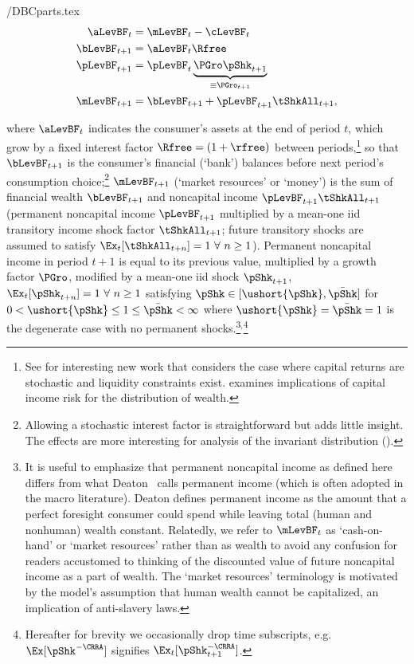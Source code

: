 \documentclass[./BufferStockTheory.tex]{subfiles}
\begin{document}
\begin{verbatimwrite}{\EqDir/DBCparts.tex}
\begin{align}
\aLevBF_{t}    & = \mLevBF_{t}-\cLevBF_{t}  \label{eq:DBCparts} \\
\bLevBF_{t+1}    & = \aLevBF_{t} \Rfree \notag \\
\pLevBF_{t+1}  & = \pLevBF_{t} \underbrace{\PGro\pShk_{t+1}}_{\equiv \PGro_{t+1}}  \notag \\
\mLevBF_{t+1}  & =  \bLevBF_{t+1} +\pLevBF_{t+1}\tShkAll_{t+1},  \notag
\end{align}
\end{verbatimwrite}
 where $\aLevBF_{t}$ indicates the consumer's assets at the end of period $t$, which grow by a fixed interest factor $\Rfree =(1+\rfree)$ between periods,\footnote{See \cite{mstCapIncFluct} for interesting new work that considers the case where capital returns are stochastic and liquidity constraints exist.  \cite{benhabibWealth} examines implications of capital income risk for the distribution of wealth.}  so that $\bLevBF_{t+1}$ is the consumer's financial (`bank') balances before next period's consumption choice;\footnote{Allowing a stochastic interest factor is straightforward but adds little insight.  The effects are more interesting for analysis of the invariant distribution (\cite{szeidlInvariant}).} $\mLevBF_{t+1}$ (`market resources' or `money') is the sum of financial wealth $\bLevBF_{t+1}$ and noncapital income $\pLevBF_{t+1}\tShkAll_{t+1}$ (permanent noncapital income $\pLevBF_{t+1}$ multiplied by a mean-one iid transitory income shock factor $\tShkAll_{t+1}$; future transitory shocks are assumed to satisfy $\Ex_{t}[{\tShkAll}_{t+n}]=1~\forall~n\geq 1$). Permanent noncapital income in period $t+1$ is equal to its previous value, multiplied by a growth factor $\PGro$, modified by a mean-one iid shock $\pShk_{t+1}$, $\Ex_{t}[{\pShk}_{t+n}]=1~\forall~n \geq 1$ satisfying $\pShk \in [\ushort{\pShk},\bar{\pShk}]$ for $0 < \ushort{\pShk} \leq 1 \leq \bar{\pShk} < \infty$ where $\ushort{\pShk}=\bar{\pShk}=1$ is the degenerate case with no permanent shocks.\footnote{It is useful to emphasize that permanent noncapital income as defined here differs from what Deaton~\citeyearpar{deatonUnderstandingC} calls permanent income (which is often adopted in the macro literature).  Deaton defines permanent income as the amount that a perfect foresight consumer could spend while leaving total (human and nonhuman) wealth constant.  Relatedly, we refer to $\mLevBF_{t}$ as `cash-on-hand' or `market resources' rather than as wealth to avoid any confusion for readers accustomed to thinking of the discounted value of future noncapital income as a part of wealth.  The `market resources' terminology is motivated by the model's assumption that human wealth cannot be capitalized, an implication of anti-slavery laws.}$^{,}$\footnote{Hereafter for brevity we occasionally drop time subscripts, e.g.\ $\Ex[\pShk^{-\CRRA}]$ signifies $\Ex_{t}[\pShk_{t+1}^{-\CRRA}]$.}
\end{document}
